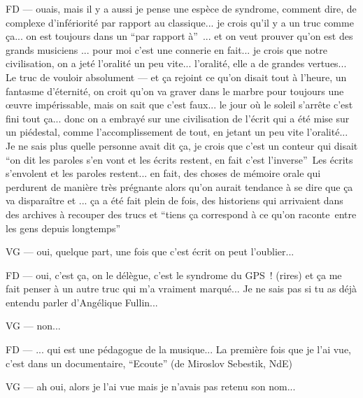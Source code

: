 FD — ouais, mais il y a aussi je pense une espèce de syndrome, comment dire, de complexe d'infériorité par rapport au classique... je crois qu'il y a un truc comme ça... on est toujours dans un ``par rapport à'' ... et on veut prouver qu'on est des grands musiciens ... pour moi c'est une connerie en fait... je crois que notre civilisation, on a jeté l'oralité un peu vite... l'oralité, elle a de grandes vertues... Le truc de vouloir absolument — et ça rejoint ce qu'on disait tout à l'heure, un fantasme d'éternité, on croit qu'on va graver dans le marbre pour toujours une œuvre impérissable, mais on sait que c'est faux... le jour où le soleil s'arrête c'est fini tout ça... donc on a embrayé sur une civilisation de l'écrit qui a été mise sur un piédestal, comme l'accomplissement de tout, en jetant un peu vite l'oralité... Je ne sais plus quelle personne avait dit ça, je crois que c'est un conteur qui disait ``on dit les paroles s'en vont et les écrits restent, en fait c'est l'inverse'' Les écrits s'envolent et les paroles restent... en fait, des choses de mémoire orale qui perdurent de manière très prégnante alors qu'on aurait tendance à se dire que ça va disparaître et ... ça a été fait plein de fois, des historiens qui arrivaient dans des archives à recouper des trucs et ``tiens ça correspond à ce qu'on raconte entre les gens depuis longtemps'' 

VG — oui, quelque part, une fois que c'est écrit on peut l'oublier... 

FD — oui, c'est ça, on le délègue, c'est le syndrome du GPS ! (rires) et ça me fait penser à un autre truc qui m'a vraiment marqué... Je ne sais pas si tu as déjà entendu parler d'Angélique Fullin... 

VG — non... 

FD — ... qui est une pédagogue de la musique... La première fois que je l'ai vue, c'est dans un documentaire, ``Ecoute'' (de Miroslov Sebestik, NdE)

VG — ah oui, alors je l'ai vue mais je n'avais pas retenu son nom... 

